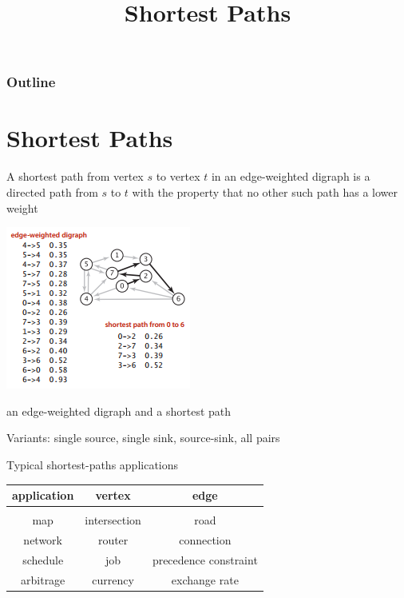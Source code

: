 \documentclass[8pt,a4paper,compress]{beamer}
\title{Shortest Paths}
\date{}
\begin{document}
\begin{frame}
\vfill
\titlepage
\end{frame}

\begin{frame}
\frametitle{Outline}
\tableofcontents
\end{frame}

\section{Shortest Paths}
\begin{frame}[fragile]
A shortest path from vertex $s$ to vertex $t$ in an edge-weighted digraph is a directed path from $s$ to $t$ with the property that no other such path has a lower weight

\begin{center}
\includegraphics[scale=0.4]{./figures/sp1.png}

\smallskip

\small an edge-weighted digraph and a shortest path
\end{center}

\bigskip

Variants: single source, single sink, source-sink, all pairs

\bigskip

Typical shortest-paths applications
\begin{center}
\begin{tabular}{ccc}
application & vertex & edge \\ \hline \\
map & intersection & road \\
network & router & connection \\
schedule & job & precedence constraint \\
arbitrage & currency & exchange rate
\end{tabular}
\end{center}
\end{frame}
\end{document}
